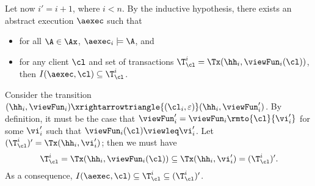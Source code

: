 Let now $i' = i + 1$, where $i < n$.
By the inductive hypothesis, there exists an abstract execution $\aexec$ such that  
\begin{itemize}
\item for all $\A \in \Ax$, $\aexec_{i} \models \A$, and 
\item for any client $\cl$ and set of transactions $\T_{\cl}^{i} = \Tx(\hh_{i}, \viewFun_{i}(\cl))$, 
then $I(\aexec, \cl) \subseteq \T_{\cl}^{i}$.
\end{itemize}
Consider the transition $(\hh_{i}, \viewFun_{i}) \xrightarrowtriangle{(\cl_{i}, \varepsilon)} (\hh_{i}, \viewFun'_{i})$. 
By definition, it must be the case that $\viewFun'_{i} = \viewFun_{i}\rmto{\cl}{\vi'_{i}}$ 
for some $\vi'_{i}$ such that $\viewFun_{i}(\cl) \viewleq \vi'_{i}$.
Let $(\T_{\cl}^{i})' = \Tx(\hh_{i}, \vi'_{i})$; then we must have 
\[
\T_{\cl}^{i} = \Tx(\hh_{i}, \viewFun_{i}(\cl)) \subseteq \Tx(\hh_{i}, \vi'_{i}) = (\T_{\cl}^{i})'. 
\]
As a consequence, $I(\aexec, \cl) \subseteq \T_{\cl}^{i} \subseteq (\T_{\cl}^{i})'$.

